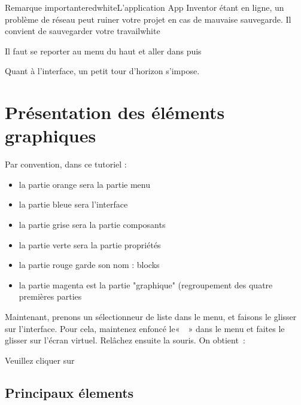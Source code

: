 \begin{messageBox}{Remarque importante}{red}{white}{L'application App Inventor étant en ligne, un problème de réseau peut ruiner votre projet en cas de mauvaise sauvegarde. Il convient de sauvegarder  votre travail}{white}
\end{messageBox}

Il faut se reporter au menu du haut et aller dans  puis 



Quant à l'interface, un petit tour d'horizon s'impose.

\section{Présentation des éléments graphiques}

Par convention, dans ce tutoriel :

\begin{itemize}
    \item la partie {\color{orange} orange} sera la partie menu
    \item la partie {\color{blue} bleue}  sera l'interface
    \item la partie {\color{gray} grise}  sera la partie composants
    \item la partie {\color{green} verte}  sera la partie propriétés
    \item la partie {\color{red} rouge}  garde son nom : blocks
    \item la partie {\color{magenta} magenta} est la partie "graphique" (regroupement des quatre premières parties
\end{itemize}

Maintenant, prenons un {\color{orange}sélectionneur de liste} dans le menu, et faisons le {\color{blue}glisser sur l'interface}. 
Pour cela, maintenez enfoncé le«  » dans le menu et faites le glisser sur l'écran virtuel. Relâchez ensuite la souris. On obtient :


Veuillez cliquer sur 


\subsection{Principaux élements} \label{menu}


